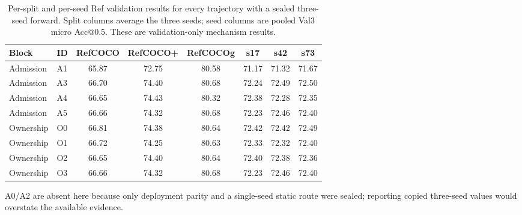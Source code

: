 \begin{table}[t]
\centering
\caption{Per-split and per-seed Ref validation results for every trajectory with a sealed three-seed forward. Split columns average the three seeds; seed columns are pooled Val3 micro Acc@0.5. These are validation-only mechanism results.}
\label{tab:supp-ref-breakdown}
\scriptsize
\setlength{\tabcolsep}{3.2pt}
\begin{tabular}{llcccccc}\toprule
Block & ID & RefCOCO & RefCOCO+ & RefCOCOg & s17 & s42 & s73\\\midrule
Admission & A1 & 65.87 & 72.75 & 80.58 & 71.17 & 71.32 & 71.67 \\
Admission & A3 & 66.70 & 74.40 & 80.68 & 72.24 & 72.49 & 72.50 \\
Admission & A4 & 66.65 & 74.43 & 80.32 & 72.38 & 72.28 & 72.35 \\
Admission & A5 & 66.66 & 74.32 & 80.68 & 72.23 & 72.46 & 72.40 \\
Ownership & O0 & 66.81 & 74.38 & 80.64 & 72.42 & 72.42 & 72.49 \\
Ownership & O1 & 66.72 & 74.25 & 80.63 & 72.33 & 72.32 & 72.40 \\
Ownership & O2 & 66.65 & 74.40 & 80.64 & 72.40 & 72.38 & 72.36 \\
Ownership & O3 & 66.66 & 74.32 & 80.68 & 72.23 & 72.46 & 72.40 \\
\bottomrule\end{tabular}
\parbox{0.97\textwidth}{\scriptsize A0/A2 are absent here because only deployment parity and a single-seed static route were sealed; reporting copied three-seed values would overstate the available evidence.}
\end{table}
